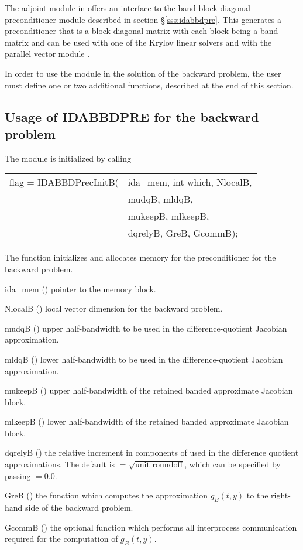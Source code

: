 The adjoint module in {\idas} offers an interface to the band-block-diagonal
preconditioner module {\idabbdpre} described in section \S\ref{sss:idabbdpre}.
This generates a preconditioner that is a block-diagonal matrix with each
block being a band matrix and can be used with one of the Krylov linear solvers
and with the parallel vector module {\nvecp}.

In order to use the {\idabbdpre} module in the solution of the backward problem,
the user must define one or two additional functions, described at the end of this section. 

\subsection{Usage of IDABBDPRE for the backward problem}
The {\idabbdpre} module is initialized by calling
{
  \begin{tabular}[t]{@{}r@{}l@{}}
    flag = IDABBDPrecInitB(&ida\_mem, int which, NlocalB, \\
                           &mudqB, mldqB, \\
                           &mukeepB, mlkeepB, \\
                           &dqrelyB, GreB, GcommB);
  \end{tabular}
}
{
  The function  initializes and allocates
  memory for the {\idabbdpre} preconditioner for the backward problem.
}
{
  \begin{args}
  \item[ida\_mem] ()
    pointer to the {\idas} memory block.
  \item[NlocalB] ()
    local vector dimension for the backward problem.
  \item[mudqB] ()
    upper half-bandwidth to be used in the difference-quotient Jacobian approximation.
  \item[mldqB] ()
    lower half-bandwidth to be used in the difference-quotient Jacobian approximation.
  \item[mukeepB] ()
    upper half-bandwidth of the retained banded approximate Jacobian block.
  \item[mlkeepB] ()
    lower half-bandwidth of the retained banded approximate Jacobian block.
  \item[dqrelyB] ()
    the relative increment in components of  used in the difference quotient
    approximations.  The default is $ = \sqrt{\text{unit roundoff}}$, which
    can be specified by passing $ = 0.0$.
  \item[GreB] ()
    the {\C} function which computes the approximation $g_B(t,y)$ to the right-hand
    side of the backward problem. 
  \item[GcommB] ()
    the optional {\C} function which performs all interprocess communication required for
    the computation of $g_B(t,y)$.
  \end{args}
}
